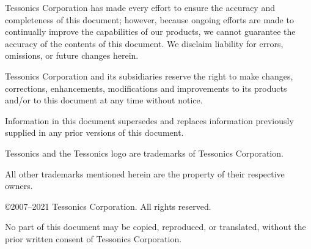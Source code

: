 \startstandardmakeup[bottom=,style=\ss\tfx]

\setupwhitespace[big] %

\startnarrower[6*left]

Tessonics Corporation has made every effort to ensure the accuracy and
completeness of this document; however, because ongoing efforts are made to
continually improve the capabilities of our products, we cannot guarantee the
accuracy of the contents of this document. We disclaim liability for errors,
omissions, or future changes herein.

Tessonics Corporation and its subsidiaries reserve the right to make changes,
corrections, enhancements, modifications and improvements to its products
and/or to this document at any time without notice.

Information in this document supersedes and replaces information previously
supplied in any prior versions of this document.

\blank

Tessonics and the Tessonics logo are trademarks of Tessonics Corporation.

All other trademarks mentioned herein are the property of their respective
owners.

\copyright 2007–2021 Tessonics Corporation. All rights reserved.

No part of this document may be copied, reproduced, or translated, without the
prior written consent of Tessonics Corporation.

\stopnarrower

\stopstandardmakeup